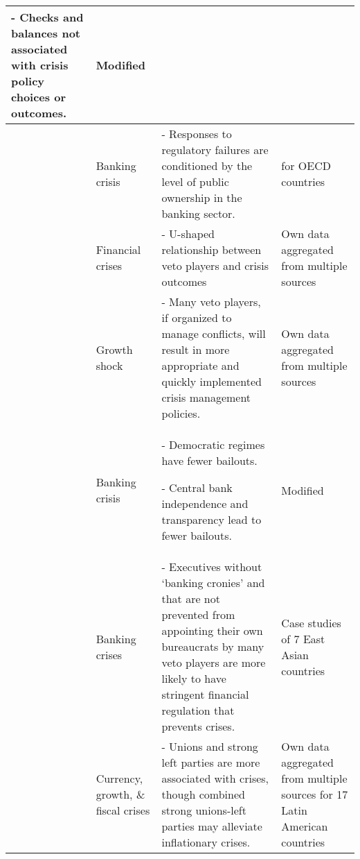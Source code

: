 \begin{tabular}{ m{2.5cm} m{1.75cm} m{6.25cm} m{2.5cm}}
    - Checks and balances not associated with crisis policy choices or outcomes. & Modified \cite{Honohan2003} \\[0.25cm]\hline

    \cite{Kleibl2013} & Banking crisis & - Responses to regulatory failures are conditioned by the level of public ownership in the banking sector. & \cite{Laeven2010,Reinhart2009} for OECD countries \\[0.25cm]\hline

    \cite{MacIntyre2001} & Financial crises & - U-shaped relationship between veto players and crisis outcomes & Own data aggregated from multiple sources \\[0.25cm]\hline

    \cite{Rodrick1999} & Growth shock & - Many veto players, if organized to manage conflicts, will result in more appropriate and quickly implemented crisis management policies. & Own data aggregated from multiple sources \\[0.25cm]\hline

    \cite{Rosas2006,Rosas2009} & Banking crisis & - Democratic regimes have fewer bailouts.

    - Central bank independence and transparency lead to fewer bailouts. & Modified \cite{Honohan2000} \\[0.25cm]\hline

    \cite{Satayanath2006} & Banking crises & - Executives without `banking cronies' and that are not prevented from appointing their own bureaucrats by many veto players are more likely to have stringent financial regulation that prevents crises. & Case studies of 7 East Asian countries \\[0.25cm]\hline

    \cite{Wibbels2010} & Currency, growth, \& fiscal crises & - Unions and strong left parties are more associated with crises, though combined strong unions-left parties may alleviate inflationary crises. & Own data aggregated from multiple sources for 17 Latin American countries \\[0.25cm]\hline


    \hline
\end{tabular}
